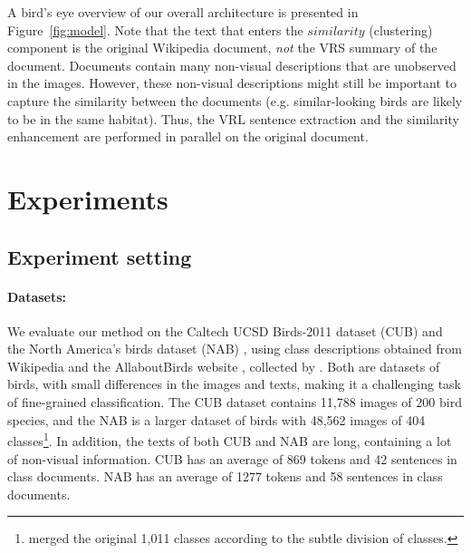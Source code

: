 \documentclass[11pt,a4paper]{article}
\newcommand\reut[1]{\textcolor{green}{\textbf{REUT:} #1 }}
\begin{document}
A bird's eye 
overview of our overall architecture is presented in Figure~\ref{fig:model}.
Note that the text that enters the $similarity$  (clustering) component is the original Wikipedia document, {\em not} the VRS summary of the document. Documents contain many non-visual descriptions that are unobserved in the images. However, these non-visual descriptions might still be important to capture the similarity between the documents (e.g. similar-looking birds are likely to be in the same habitat). Thus, the VRL sentence extraction and the similarity enhancement are performed in parallel on the original document. 
\section{Experiments}

\subsection{Experiment setting}

\paragraph{Datasets:}  We evaluate our method on the Caltech UCSD Birds-2011 dataset (CUB) \citet{wah2011caltech} and the North America’s birds dataset (NAB) \cite{van2015building}, using class descriptions obtained from Wikipedia and the AllaboutBirds website \cite{AllaboutBirds}, collected by \citet{elhoseiny2017link}. 
Both are datasets of birds, with small differences in the images and texts, making it a challenging task of fine-grained classification. The CUB dataset contains 11,788 images of 200 bird species, and the NAB
is a larger dataset of birds with 48,562 images of 404 classes\footnote{\citet{elhoseiny2017link} merged the original 1,011 classes according to the subtle division of classes.}.
In addition, the texts of both CUB and NAB are long, containing a lot of non-visual information. CUB has an average of 869 tokens and 42 sentences in class documents. NAB has an average of 1277 tokens and 58 sentences in class documents. 
\end{document}
